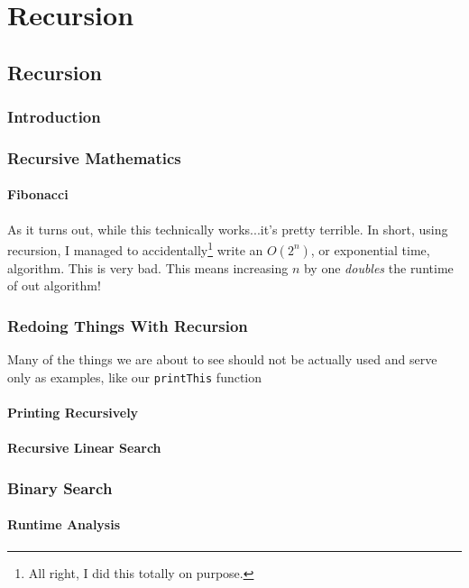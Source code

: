 \documentclass[10pt,a4paper]{book}
\begin{document}
\part{Recursion}
\chapter{Recursion}

\section{Introduction}

\section{Recursive Mathematics}

\subsection{Fibonacci}
As it turns out, while this technically works...it's pretty terrible.  In short, using recursion, I managed to accidentally\footnote{All right, I did this totally on purpose.} write an $ O(2^n) $, or exponential time,  algorithm.  This is very bad.  This means increasing $ n $ by one \emph{doubles} the runtime of out algorithm!


\section{Redoing Things With Recursion}
Many of the things we are about to see should not be actually  used and serve only as examples, like our \texttt{printThis} function

\subsection{Printing Recursively}
\subsection{Recursive Linear Search}


\section{Binary Search}



\subsection{Runtime Analysis}
\end{document}
